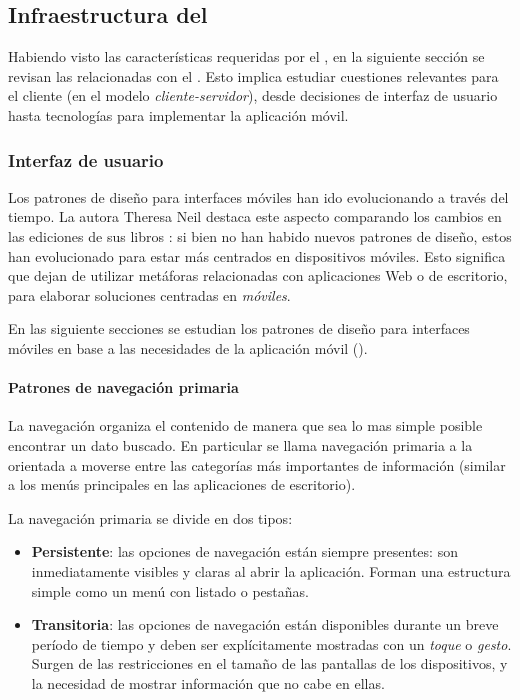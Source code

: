 \subsection{Infraestructura del }
\label{interfaz_usuario}

Habiendo visto las características requeridas por el , en la siguiente sección se revisan las relacionadas con el . Esto implica estudiar cuestiones relevantes para el cliente (en el modelo \textit{cliente-servidor}), desde decisiones de interfaz de usuario hasta tecnologías para implementar la aplicación móvil.

\subsubsection{Interfaz de usuario}
\label{interfaz_usuario}

Los patrones de diseño para interfaces móviles han ido evolucionando a través del tiempo. La autora Theresa Neil destaca este aspecto comparando los cambios en las ediciones de sus libros \cite{neil2014mobile}: si bien no han habido nuevos patrones de diseño, estos han evolucionado para estar más centrados en dispositivos móviles. Esto significa que dejan de utilizar metáforas relacionadas con aplicaciones Web o de escritorio, para elaborar soluciones centradas en \textit{móviles}.

En las siguiente secciones se estudian los patrones de diseño para interfaces móviles en base a las necesidades de la aplicación móvil ().

\paragraph{Patrones de navegación primaria}
\label{navegacion_primaria}

La navegación organiza el contenido de manera que sea lo mas simple posible encontrar un dato buscado. En particular se llama navegación primaria a la orientada a moverse entre las categorías más importantes de información (similar a los menús principales en las aplicaciones de escritorio).

La navegación primaria se divide en dos tipos\cite{neil2014mobile}:
\begin{itemize}
\item \textbf{Persistente}: las opciones de navegación están siempre presentes: son inmediatamente visibles y claras al abrir la aplicación. Forman una estructura simple como un menú con listado o pestañas.
\item \textbf{Transitoria}: las opciones de navegación están disponibles durante un breve período de tiempo y deben ser explícitamente mostradas con un \textit{toque} o \textit{gesto}. Surgen de las restricciones en el tamaño de las pantallas de los dispositivos, y la necesidad de mostrar información que no cabe en ellas.
\end{itemize}

